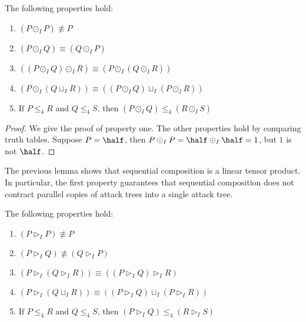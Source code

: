 \begin{lemma}
  \label{lemma:basic_properties_for_parallel}
  The following properties hold:
  \begin{enumerate}
  \item $(P \odot_I P) \not\equiv P$\\[-5px]
  \item $(P \odot_I Q) \equiv (Q \odot_I P)$\\[-5px]
  \item $((P \odot_I Q) \odot_I R) \equiv (P \odot_I (Q \odot_I R))$\\[-5px]
  \item $(P \odot_I (Q \sqcup_I R)) \equiv ((P \odot_I Q) \sqcup_I (P \odot_I R))$\\[-5px]
  \item $\text{If }P \leq_4 R \text{ and } Q \leq_4 S \text{, then } (P \odot_I Q) \leq_4 (R \odot_I S)$
  \end{enumerate}
\end{lemma}
\begin{proof}
  We give the proof of property one.  The other properties hold by
  comparing truth tables.  Suppose $P = \half$, then $P \odot_I P =
  \half \odot_I \half = 1$, but $1$ is not $\half$.
\end{proof}
The previous lemma shows that sequential composition is a linear
tensor product.  In particular, the first property guarantees that
sequential composition does not contract parallel copies of attack
trees into a single attack tree.
\begin{lemma}
  \label{lemma:basic_properties_for_parallel}
  The following properties hold:
  \begin{enumerate}
  \item $(P \rhd_I P) \not\equiv P$\\[-5px]
  \item $(P \rhd_I Q) \not\equiv (Q \rhd_I P)$\\[-5px]
  \item $(P \rhd_I (Q \rhd_I R)) \equiv ((P \rhd_I Q) \rhd_I R)$\\[-5px]
  \item $(P \rhd_I (Q \sqcup_I R)) \equiv ((P \rhd_I Q) \sqcup_I (P \rhd_I R))$\\[-5px]
  \item $\text{If }P \leq_4 R \text{ and } Q \leq_4 S \text{, then } (P \rhd_I Q) \leq_4 (R \rhd_I S)$
  \end{enumerate}
\end{lemma}
